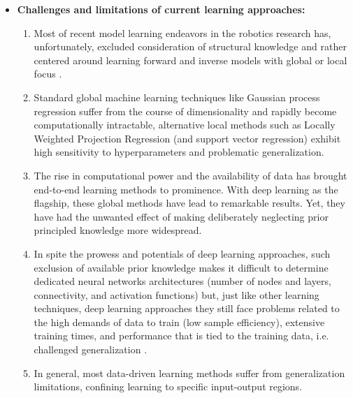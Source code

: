 \documentclass[12pt, a4paper]{article}
\begin{document}
\begin{itemize}
	\item \textbf{Challenges and limitations of current learning approaches:}
	\begin{enumerate}
		\item Most of recent model learning endeavors in the robotics research has, unfortunately, excluded consideration of structural knowledge and rather centered around learning forward and inverse models with global or local focus \cite{NguyenTuong2011Modellearningrobot}.
		\item Standard global machine learning techniques like Gaussian process regression suffer from the course of dimensionality and rapidly become computationally intractable, alternative local methods such as Locally Weighted Projection Regression (and support vector regression) exhibit high sensitivity to hyperparameters and problematic generalization.
		\item The rise in computational power and the availability of data has brought end-to-end learning methods to prominence. With deep learning as the flagship, these global methods have lead to remarkable results. Yet, they have had the unwanted effect of making deliberately neglecting prior principled knowledge more widespread.
		\item In spite the prowess and potentials of deep learning approaches, such exclusion of available prior knowledge makes it difficult to determine dedicated neural networks architectures (number of nodes and layers, connectivity, and activation functions) \cite{Baker2017Designingneuralnetwork,Elsken2019Neuralarchitecturesearch} but, just like other learning techniques, deep learning approaches they still face problems related to the high demands of data to train (low sample efficiency), extensive training times, and performance that is tied to the training data, i.e. challenged generalization \cite{Pierson2017Deeplearningrobotics,Suenderhauf2018limitspotentialsdeep}.
		\item In general, most data-driven learning methods suffer from generalization limitations, confining learning to specific input-output regions.
	\end{enumerate}	
	

\end{itemize}
\end{document}
